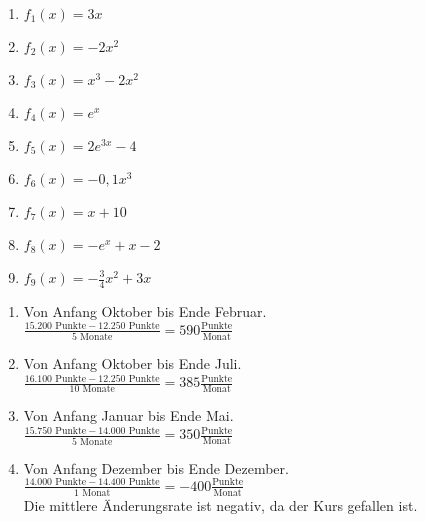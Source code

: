 \begin{minipage}{\textwidth}
	\begin{Exercise}[title={Bestimme jeweils die durchschnittliche Änderungsrate auf den Intervallen \(I_1=[0,\ 2]\) sowie \(I_2=[-2,\ 2]\) und \(I_3=[-1,\ 4]\). Du kannst auf 2 Nachkommastellen runden, falls notwendig.}, label=aenderungsrateA2]
		\begin{enumerate}[label=\alph*)]
			\item \(f_1(x)=3x\)
			\item \(f_2(x)=-2x^2\)
			\item \(f_3(x)=x^3-2x^2\)
			\item \(f_4(x)=e^x\)
			\item \(f_5(x)=2e^{3x}-4\)
			\item \(f_6(x)=-0,1x^3\)
			\item \(f_7(x)=x+10\)
			\item \(f_8(x)=-e^x+x-2\)
			\item \(f_9(x)=-\frac{3}{4}x^2+3x\)
		\end{enumerate}
	\end{Exercise}
\end{minipage}
\begin{Answer}[ref=aenderungsrateA1]
	\begin{enumerate}[label=\alph*)]
		\item Von Anfang Oktober bis Ende Februar.\\
		\(\frac{15.200\text{ Punkte}-12.250\text{ Punkte}}{5\text{ Monate}}= 590\frac{\text{Punkte}}{\text{Monat}}\)
		\item Von Anfang Oktober bis Ende Juli.\\
		\(\frac{16.100\text{ Punkte}-12.250\text{ Punkte}}{10\text{ Monate}}= 385\frac{\text{Punkte}}{\text{Monat}}\)
		\item Von Anfang Januar bis Ende Mai.\\
		\(\frac{15.750\text{ Punkte}-14.000\text{ Punkte}}{5\text{ Monate}}= 350\frac{\text{Punkte}}{\text{Monat}}\)
		\item Von Anfang Dezember bis Ende Dezember.\\
		\(\frac{14.000\text{ Punkte}-14.400\text{ Punkte}}{1\text{ Monat}}=-400\frac{\text{Punkte}}{\text{Monat}}\)\\
		Die mittlere Änderungsrate ist negativ, da der Kurs gefallen ist.
	\end{enumerate}
\end{Answer}
